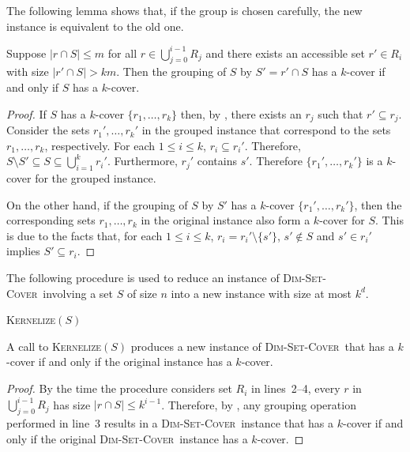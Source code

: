 \documentclass[ccfonts,lotsofwhite]{patmorin}
\newcommand{\setcover}{\textsc{Dim-Set-Cover}}
\begin{document}
The following lemma shows that, if the group is chosen carefully, the
new instance is equivalent to the old one.

\begin{lem}
Suppose $|r\cap S|\le m$ for all $r\in \bigcup_{j=0}^{i-1} R_j$ and
there exists an accessible set $r'\in R_i$ with size $|r'\cap S|> km$.
Then the grouping of $S$ by $S'=r'\cap S$ has a $k$-cover if and only
if $S$ has a $k$-cover.
\end{lem}

\begin{proof} 
If $S$ has a $k$-cover $\{r_1,\ldots,r_k\}$ then, by
, there exists an $r_j$ such that $r'\subseteq
r_j$.  Consider the sets $r_1',\ldots,r_k'$ in the grouped instance
that correspond to the sets $r_1,\ldots,r_k$, respectively.  For each
$1\le i\le k$, $r_i\subseteq r_i'$. Therefore, $S\setminus S'\subseteq
S\subseteq \bigcup_{i=1}^kr_i'$.  Furthermore, $r_j'$ contains $s'$.
Therefore $\{r_1',\ldots,r_k'\}$ is a $k$-cover for the grouped instance.

On the other hand, if the grouping of $S$ by $S'$ has a $k$-cover
$\{r_1',\ldots,r_k'\}$, then the corresponding sets $r_1,\ldots,r_k$
in the original instance also form a $k$-cover for $S$.  This is due
to the facts that, for each $1\le i\le k$, $r_i=r_i'\setminus\{s'\}$,
$s'\notin S$ and $s'\in r_i'$ implies $S'\subseteq r_i$.  \end{proof}

The following procedure is used to reduce an instance of \setcover\
involving a set $S$ of size $n$ into a new instance with size at most
$k^{d}$.

\noindent
\begin{minipage}{\textwidth}
\textsc{Kernelize}$(S)$
\begin{algorithmic}[1]
    \STATE{group $S$ by $r\cap S$}
  \ENDWHILE
\ENDFOR
\end{algorithmic}
\end{minipage}

\begin{lem}
A call to \textsc{Kernelize}$(S)$ produces a new instance of
\setcover\ that has a $k$-cover if and only if the original instance
has a $k$-cover.
\end{lem}

\begin{proof}
By the time the procedure considers set $R_i$ in lines~2--4, every $r$
in $\bigcup_{j=0}^{i-1} R_j$ has size $|r\cap S|\le k^{i-1}$.  Therefore, by
\lemref{grouping}, any grouping operation performed in line~3 results
in a \setcover\ instance that has a $k$-cover if and only if the
original \setcover\ instance has a $k$-cover.
\end{proof}
\end{document}
